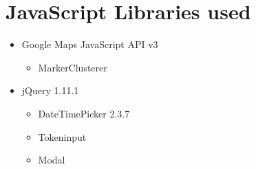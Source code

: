 \section{JavaScript Libraries used}
\begin{itemize}
  \item Google Maps JavaScript API v3
  \begin{itemize}
    \item MarkerClusterer
  \end{itemize}
  \item jQuery 1.11.1
  \begin{itemize}
    \item DateTimePicker 2.3.7
    \item Tokeninput
    \item Modal
  \end{itemize}
\end{itemize}